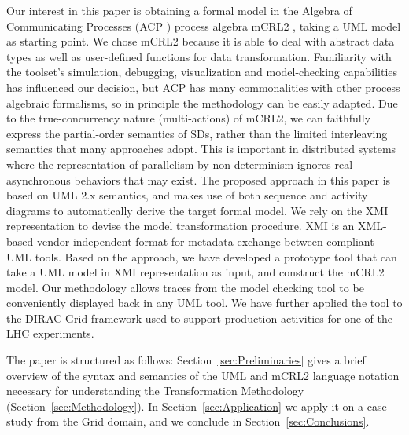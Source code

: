 \documentclass[letter]{llncs}
\newcommand{\secshrink}{\vspace{-.5cm}}
\begin{document}
Our interest in this paper is obtaining a formal model in the Algebra of
Communicating Processes (ACP \cite{process_algebra}) process algebra mCRL2
\cite{FormalLanguagemCRL2},
taking a UML model as starting point. We chose mCRL2 because it is able to deal
with abstract
data types as well as user-defined functions for data transformation.
Familiarity with the toolset's simulation,
debugging,
visualization and model-checking capabilities has
influenced our decision, but ACP has many commonalities with
other process algebraic formalisms,
so in principle the methodology can be easily adapted.
Due to the true-concurrency nature (multi-actions) of mCRL2, we can faithfully express the
partial-order semantics of SDs, rather than the limited interleaving semantics that many approaches 
adopt. This is important in distributed systems where the representation of parallelism by non-determinism
ignores real asynchronous behaviors that may exist.
The proposed approach in this paper is based on UML 2.x semantics, and makes use
of both sequence and activity diagrams to automatically derive the target formal model.
We rely on the XMI representation
to devise the model transformation procedure. XMI \cite{UML2.4} is an XML-based vendor-independent format for metadata exchange between
compliant UML tools.
Based on the approach, we have
developed 
a prototype tool that can take a UML model in XMI representation as input, and
construct
the mCRL2 model. Our methodology allows traces from the model
checking tool 
to be conveniently displayed back in any UML tool. 
We have further applied the tool to the DIRAC \cite{DIRAC_CommGridSolution} Grid
framework used to support production activities
for one of the LHC experiments. 

The paper is structured as follows: Section~\ref{sec:Preliminaries} gives a brief overview of the 
syntax and semantics of the UML and mCRL2 language notation necessary for understanding the Transformation Methodology (Section~\ref{sec:Methodology}).
In Section~\ref{sec:Application} we apply it on a case study from the Grid domain, and we conclude in Section~\ref{sec:Conclusions}.
\vspace{-2 pt}
\secshrink
\end{document}
